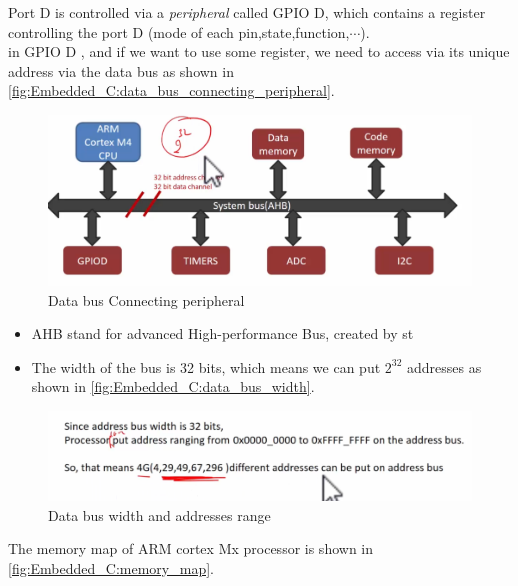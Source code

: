 Port D is controlled via a \textit{peripheral} called GPIO D, which contains a register controlling the port D (mode of each pin,state,function,$\cdots$).\\

 in GPIO D , and if we want to use some register, we need to access via its unique address via the data bus as shown in \autoref{fig:Embedded_C:data_bus_connecting_peripheral}.

\begin{figure}[h]
\centering
\includegraphics[scale=0.7]{Figures/Embedded_C/data_bus_connecting_peripheral}
\caption{Data bus Connecting peripheral}
\label{fig:Embedded_C:data_bus_connecting_peripheral}
\end{figure}

\begin{itemize}
    \item AHB stand for advanced High-performance Bus, created by st
    
    \item The width of the bus is 32 bits, which means we can put $2^{32}$ addresses as shown in \autoref{fig:Embedded_C:data_bus_width}.
\end{itemize}

\begin{figure}[h]
\centering
\includegraphics[scale=0.7]{Figures/Embedded_C/data_bus_width}
\caption{Data bus width and addresses range}
\label{fig:Embedded_C:data_bus_width}
\end{figure}

\newpage
The memory map of ARM cortex Mx processor is shown in \autoref{fig:Embedded_C:memory_map}.

